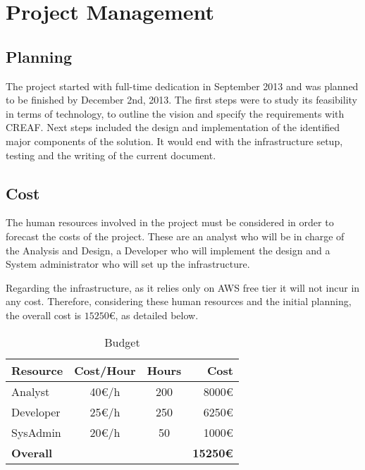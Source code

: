 \chapter{Project Management}

\section{Planning}

The project started with full-time dedication in September 2013 and was planned to be finished by December 2nd, 2013. The first steps were to study its feasibility in terms of technology, to outline the vision and specify the requirements with CREAF. Next steps included the design and implementation of the identified major components of the solution. It would end with the infrastructure setup, testing and the writing of the current document.



\section{Cost}

The human resources involved in the project must be considered in order to forecast the costs of the project. These are an analyst who will be in charge of the Analysis and Design, a Developer who will implement the design and a System administrator who will set up the infrastructure.

Regarding the infrastructure, as it relies only on AWS free tier it will not incur in any cost. Therefore, considering these human resources and the initial planning, the overall cost is $15250\euro{}$, as detailed below.

\begin{table}[H]
    \centering
    \begin{tabular}{|l|c|c|r|}
    \hline
    \textbf{Resource}  & \textbf{Cost/Hour}  & \textbf{Hours}  & \textbf{Cost} \\ \hline
    Analyst            & 40\euro{}/h         & 200             & 8000\euro{}   \\ \hline
    Developer          & 25\euro{}/h         & 250             & 6250\euro{}   \\ \hline
    SysAdmin           & 20\euro{}/h         & 50              & 1000\euro{}    \\ \hline
    \textbf{Overall}   &                     &                 & \textbf{15250\euro{}} \\ \hline
    \end{tabular}
    \caption{Budget}
    \label{tab:budget}
\end{table}

